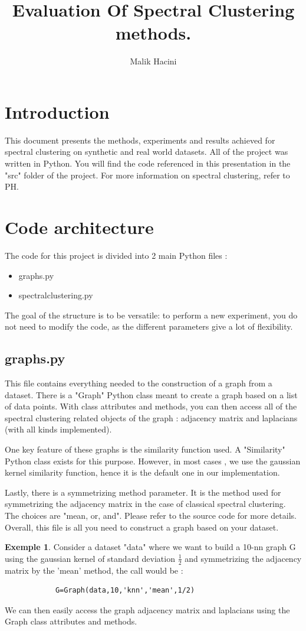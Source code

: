 \documentclass[a4paper,12pt]{article}
\title{Evaluation Of Spectral Clustering methods.}
\author{Malik Hacini}
\theoremstyle{definition}
\newtheorem*{ex}{Exemple}
\theoremstyle{plain}
\begin{document}
	\maketitle
	\tableofcontents
	\section{Introduction}
	This document presents the methods, experiments and results achieved for spectral clustering on synthetic and real world datasets. All of the project was written in Python. You will find the code referenced in this presentation in the "src" folder of the project. For more information on spectral clustering, refer to PH.
	\section{Code architecture}
	The code for this project is divided into 2 main Python files :
	\begin{itemize}
		\item graphs.py
		\item spectralclustering.py
	\end{itemize}
	The goal of the structure is to be versatile: to perform a new experiment, you do not need to modify the code, as the different parameters give a lot of flexibility.
	\subsection{graphs.py}
	This file contains everything needed to the construction of a graph from a dataset. There is a "Graph" Python class meant to create a graph based on a list of data points. 
	With class attributes and methods, you can then access all of the spectral clustering related objects of the graph : adjacency matrix and laplacians (with all kinds implemented).
	
	One key feature of these graphs is the similarity function used. A "Similarity" Python class exists for this purpose. However, in most cases , we use the gaussian kernel similarity function, hence it is the default one in our implementation.
	
	Lastly, there is a symmetrizing method parameter. It is the method used for symmetrizing the adjacency matrix in the case of classical spectral clustering. The choices are "mean, or, and". Please refer to the source code for more details.
	Overall, this file is all you need to construct a graph based on your dataset.
	\begin{ex}
		Consider a dataset "data" where we want to build a 10-nn graph G using the gaussian kernel of standard deviation $\frac{1}{2}$ and symmetrizing the adjacency matrix by the 'mean' method, the call would be :
		\begin{lstlisting}
			G=Graph(data,10,'knn','mean',1/2)
		\end{lstlisting}
		We can then easily access the graph adjacency matrix and laplacians using the Graph class attributes and methods.
	\end{ex}
\end{document}
